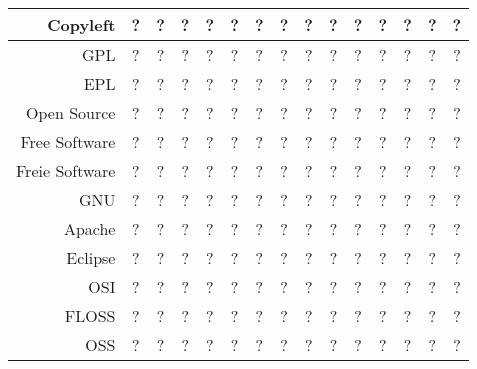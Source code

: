 \documentclass[DIV=calc,BCOR=5mm,11pt,headings=small,oneside,abstract=false, toc=bib]{scrartcl}
\begin{document}
\begin{table}
\begin{center}
\begin{tabular}[h]{|r||c|c|c||c|c||c|c|c|c|c|c||c|c|c|}
\hline
Copyleft
  & ? & ? & ? & ? & ? 
  & ? & ? & ? & ? & ? 
  & ? & ? & ? & ?\\
\hline
\hline
GPL
  & ? & ? & ? & ? & ? 
  & ? & ? & ? & ? & ? 
  & ? & ? & ? & ?\\
\hline
EPL
  & ? & ? & ? & ? & ? 
  & ? & ? & ? & ? & ? 
  & ? & ? & ? & ?\\
\hline 
\hline
Open Source
  & ? & ? & ? & ? & ? 
  & ? & ? & ? & ? & ? 
  & ? & ? & ? & ?\\
\hline
Free Software
  & ? & ? & ? & ? & ? 
  & ? & ? & ? & ? & ? 
  & ? & ? & ? & ?\\
\hline
Freie Software
  & ? & ? & ? & ? & ? 
  & ? & ? & ? & ? & ? 
  & ? & ? & ? & ?\\
\hline
GNU
  & ? & ? & ? & ? & ? 
  & ? & ? & ? & ? & ? 
  & ? & ? & ? & ?\\
\hline
Apache
  & ? & ? & ? & ? & ? 
  & ? & ? & ? & ? & ? 
  & ? & ? & ? & ?\\
\hline
Eclipse
  & ? & ? & ? & ? & ? 
  & ? & ? & ? & ? & ? 
  & ? & ? & ? & ?\\
\hline
\hline
OSI
  & ? & ? & ? & ? & ? 
  & ? & ? & ? & ? & ? 
  & ? & ? & ? & ?\\
\hline
FLOSS
  & ? & ? & ? & ? & ? 
  & ? & ? & ? & ? & ? 
  & ? & ? & ? & ?\\
\hline
OSS
  & ? & ? & ? & ? & ? 
  & ? & ? & ? & ? & ? 
  & ? & ? & ? & ?\\
\hline
\end{tabular}
\end{center}
\end{table}
\newpage
\small

\end{document}
